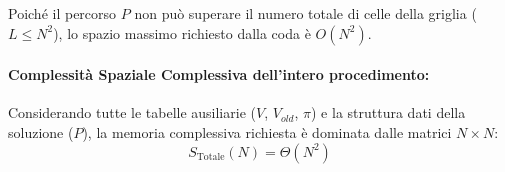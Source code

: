 \noindent
Poiché il percorso $P$ non può superare il numero totale di celle della griglia ($L \le N^2$), lo spazio massimo richiesto dalla coda è $O(N^2)$.

\paragraph{Complessità Spaziale Complessiva dell'intero procedimento:}
Considerando tutte le tabelle ausiliarie ($V$, $V_{old}$, $\pi$) e la struttura dati della soluzione ($P$), la memoria complessiva richiesta è dominata dalle matrici $N \times N$:
\[
S_{\text{Totale}}(N) = \Theta(N^2)
\]
